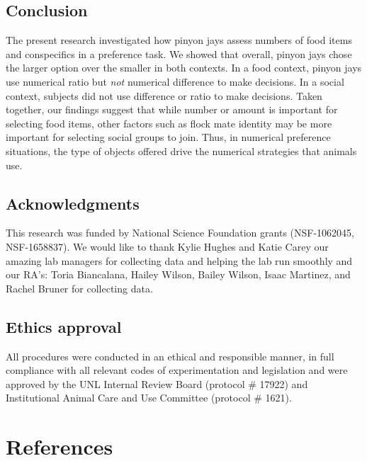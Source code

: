 \documentclass[
  ,doc,floatsintext]{apa6}
\begin{document}
\hypertarget{conclusion}{%
\subsection{Conclusion}\label{conclusion}}

The present research investigated how pinyon jays assess numbers of food items and conspecifics in a preference task. We showed that overall, pinyon jays chose the larger option over the smaller in both contexts. In a food context, pinyon jays use numerical ratio but \emph{not} numerical difference to make decisions. In a social context, subjects did not use difference or ratio to make decisions. Taken together, our findings suggest that while number or amount is important for selecting food items, other factors such as flock mate identity may be more important for selecting social groups to join. Thus, in numerical preference situations, the type of objects offered drive the numerical strategies that animals use.

\hypertarget{acknowledgments}{%
\subsection{Acknowledgments}\label{acknowledgments}}

This research was funded by National Science Foundation grants (NSF-1062045,
NSF-1658837). We would like to thank Kylie Hughes and Katie Carey our amazing lab managers for collecting data and helping the lab run smoothly and our RA's: Toria Biancalana, Hailey Wilson, Bailey Wilson, Isaac Martinez, and Rachel Bruner for collecting data.

\hypertarget{ethics-approval}{%
\subsection{Ethics approval}\label{ethics-approval}}

All procedures were conducted in an ethical and responsible manner, in full compliance with all relevant codes of experimentation and legislation and were approved by the UNL Internal Review Board (protocol \# 17922) and Institutional Animal Care and Use Committee (protocol \# 1621).

\newpage

\hypertarget{references}{%
\section{References}\label{references}}
\end{document}
